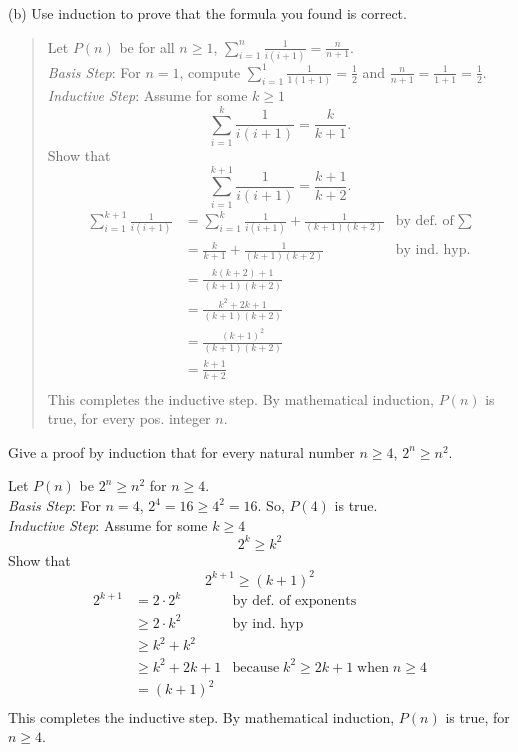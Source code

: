 \documentclass[11pt]{exam}
\begin{document}
\begin{questions}
\begin{solution}
(b) Use induction to prove that the formula you found is correct.\\
\begin{quote}
Let $P(n)$ be for all $n \geq 1$, $\displaystyle \sum_{i=1}^n \frac{1}{i(i+1)} =  \frac{n}{n+1}.$ \\
\textit{Basis Step}: For $n=1$, compute $\sum_{i=1}^1 \frac{1}{1(1+1)} = \frac{1}{2}$ and $\frac{n}{n+1} = \frac{1}{1+1} = \frac{1}{2}$.  \\
\textit{Inductive Step}: Assume for some $k \geq 1$
 \[ \sum_{i=1}^k \frac{1}{i(i+1)} = \frac{k}{k+1}. \]
 Show that
 \[ \sum_{i=1}^{k+1} \frac{1}{i(i+1)} = \frac{k+1}{k+2}. \]
 \begin{align*}
    \sum_{i=1}^{k+1} \frac{1}{i(i+1)} &= \sum_{i=1}^k \frac{1}{i(i+1)}  + \frac{1}{(k+1)(k+2)}  & \text{by def. of}\; \sum \\
      &= \frac{k}{k+1} + \frac{1}{(k+1)(k+2)}  & \text{by ind. hyp.} \\
      &= \frac{k(k+2) + 1}{(k+1)(k+2)} \\
      &= \frac{k^2 + 2k + 1}{(k+1)(k+2)} \\
      &= \frac{(k+1)^2}{(k+1)(k+2)} \\
      &= \frac{k+1}{k+2} \\
 \end{align*}
 This completes the inductive step.  By mathematical induction, $P(n)$ is true, for every pos. integer $n$.
\end{quote}
\end{solution}

\question Give a proof by induction that for every natural number $n
\geq 4$, $2^n \geq n^2$.

\begin{solution}
    Let $P(n)$ be $2^n \geq n^2$ for $n \geq 4$. \\
    \textit{Basis Step}: For $n=4$, $2^4 = 16 \geq 4^2 = 16$. So, $P(4)$ is true. \\
    \textit{Inductive Step}: Assume for some $k \geq 4$
    \[ 2^k \geq k^2 \]
    Show that
    \[ 2^{k+1} \geq (k+1)^2 \]
    \begin{align*}
        2^{k+1} &= 2 \cdot 2^{k}  & \text{by def. of exponents} \\
          &\geq 2 \cdot k^2     & \text{by ind. hyp} \\
          &\geq k^2 + k^2  \\
          &\geq k^2 + 2k + 1 & \text{because}\; k^2 \geq 2k +1 \;\text{when}\; n \geq 4 \\
          &= (k+1)^2 \\
    \end{align*}
    This completes the inductive step.  By mathematical induction, $P(n)$ is true, for $n \geq 4$.
\end{solution}


\end{questions}
\end{document}
